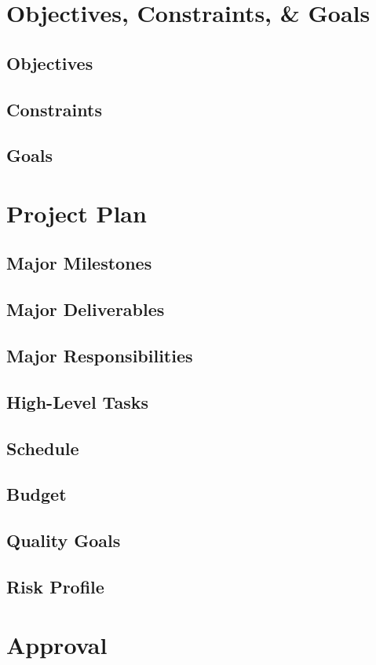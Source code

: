 \documentclass[10pt,letterpaper]{article}
\begin{document}
\section{Objectives, Constraints, \& Goals}
\subsection{Objectives}
\subsection{Constraints}
\subsection{Goals}

\section{Project Plan}

\subsection{Major Milestones}
\subsection{Major Deliverables}
\subsection{Major Responsibilities}
\subsection{High-Level Tasks}
\subsection{Schedule}
\subsection{Budget}
\subsection{Quality Goals}
\subsection{Risk Profile}

\section{Approval}
\end{document}
